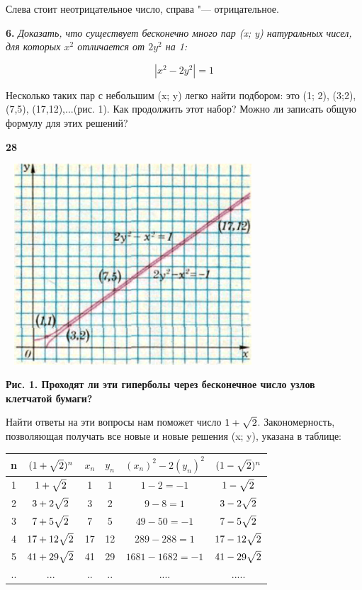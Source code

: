 \begin{multicols}{2}
\noindent Слева стоит неотрицательное число, справа 
"--- отрицательное.

\textbf{6.} \textit{Доказать, что существует бесконечно много пар (x; y) натуральных чисел, 
для которых $x^2$ отличается от $2y^2$ на 1:}

\[
  |x^2 - 2y^2| = 1 \tag{5}
\]

Несколько таких пар с небольшим
(x; y) легко найти подбором: это (1; 2), 
(3;2), (7,5), (17,12),...(рис. 1). Как 
продолжить этот набор? Можно ли запиcать общую формулу для этих решений?
\begin{flushleft}
    \textbf{28}
\end{flushleft}
\columnbreak
\includegraphics[height=75mm,width=95mm]{kvant_pic1.png}

\noindent \textbf{Рис. 1. Проходят ли эти гиперболы через бесконечное число узлов клетчатой бумаги?}
\bigskip

Найти ответы на эти вопросы нам поможет
число $1 + \sqrt{2\mathstrut}$. Закономерность, позволяющая получать все новые и новые решения (x; y), указана в таблице:

\scriptsize
\bigskip
\noindent \begin{tabular}{|c|c|c|c|c|c|}
    \hline
    n & $(1 + \sqrt{2\mathstrut})^n$ & $x_n$ & $y_n$ & $(x_n)^2 - 2(y_n)^2$ & $(1 - \sqrt{2\mathstrut})^n$ \\ [2.5ex]
    \hline
    1 & $1 + \sqrt{2\mathstrut}$ & 1 & 1 & $1 - 2 = -1$ & $1 - \sqrt{2\mathstrut}$ \\
    2 & $3 + 2\sqrt{2\mathstrut}$ & 3 & 2 & $9 - 8 = 1$ & $3 - 2\sqrt{2\mathstrut}$ \\
    3 & $7 + 5\sqrt{2\mathstrut}$ & 7 & 5 & $49 - 50 = -1$ & $7 - 5\sqrt{2\mathstrut}$ \\
    4 & $17 + 12\sqrt{2\mathstrut}$ & 17 & 12 & $289 - 288 = 1$ & $17 - 12\sqrt{2\mathstrut}$ \\
    5 & $41 + 29\sqrt{2\mathstrut}$ & 41 & 29 & $1681 - 1682 = -1$ & $41 - 29\sqrt{2\mathstrut}$ \\[2.5ex]
    .. & ... & .. & .. & .... & .....\\[2.5ex]
    \hline
\end{tabular}


\end{multicols}
